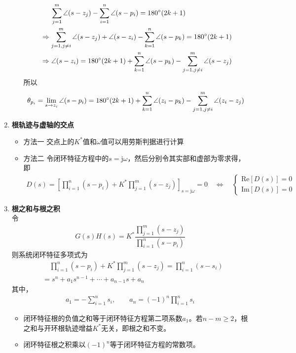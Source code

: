 \begin{enumerate}
\begin{itemize}
	\begin{align*}
		& \quad \,\,\, \sum_{j = 1}^{m}\angle (s - z_j) - \sum_{i = 1}^{n} \angle(s - p_i) = 180 {}^{\circ} (2k + 1)\\
		&\Rightarrow 	\sum_{j = 1, j \neq i}^{m}\angle (s - z_j) + \angle (s - z_i)- \sum_{k = 1}^{n} \angle(s - p_k) = 180 {}^{\circ} (2k + 1) \\
		&\Rightarrow \angle (s - z_i) = 180 {}^{\circ} (2k + 1) + \sum_{k = 1}^{n} \angle(s - p_k) - \sum_{j = 1, j \neq i}^{m}\angle (s - z_j)
	\end{align*}
	所以
	\begin{align}
		\theta_{p_i} = \lim\limits_{s \to z_i} \angle (s - p_i) =  180 {}^{\circ} (2k + 1) + \sum_{k = 1}^{n} \angle(z_i - p_k) - \sum_{j = 1, j \neq i}^{m}\angle (z_i - z_j)
	\end{align}
	\end{itemize}


	\item \textbf{根轨迹与虚轴的交点}
	\vspace*{-1em}
	\begin{itemize}
		\item 方法一 \quad 交点上的$K^*$值和$\omega$值可以用劳斯判据进行计算
		\item 方法二 \quad 令闭环特征方程中的$s = \text{j}\omega$，然后分别令其实部和虚部为零求得，即
		\begin{align}
			D(s) = \left[\prod_{i = 1}^n (s - p_i) + K^* \prod_{j = 1}^{m}(s - z_j) \right]_{s=\text{j}\omega} = 0 \quad \Longleftrightarrow \quad 
			\begin{cases}
				\text{Re}\left[D(s)\right] = 0\\
				\text{Im}\left[D(s)\right] = 0
			\end{cases}
		\end{align}
	\end{itemize}

	
	\item \textbf{根之和与根之积}\\
	令
	\begin{align*}
		G(s)H(s) = K^* \dfrac{\displaystyle \prod_{j = 1}^m (s - z_j)}{\displaystyle \prod_{i = 1}^n (s - p_i)}
	\end{align*}
	则系统闭环特征多项式为
	\begin{align*}
		&\quad \prod_{i = 1}^n (s - p_i) + K^*\prod_{j = 1}^m (s - z_j) = \prod_{i = 1}^n(s - s_i)\\
		& = s^n + a_1 s^{n-1} + \cdots + a_{n-1}s + a_n
	\end{align*}
	其中，
	\begin{align}
		a_1 = - \sum_{i = 1}^n s_i, \quad \quad a_n = (-1)^n \prod_{i=1}^{n} s_i 
	\end{align}
\begin{itemize}
	\item 闭环特征根的负值之和等于闭环特征方程第二项系数$a_1$。若$n - m \ge 2$，根之和与开环根轨迹增益$K^*$无关，即根之和不变。
	\item 闭环特征根之积乘以$(-1)^n$等于闭环特征方程的常数项。	
\end{itemize}
	
\end{enumerate}

